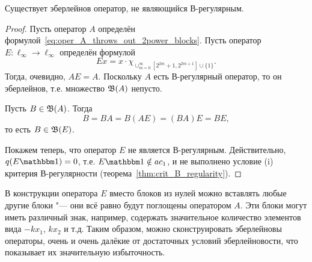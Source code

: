 \begin{theorem}
	\label{thm:Eberlein_but_not_B-regular_exists}
	Существует эберлейнов оператор, не являющийся В-регулярным.
\end{theorem}

\begin{proof}
	Пусть оператор $A$ определён формулой~\eqref{eq:oper_A_throws_out_2power_blocks}.
	Пусть оператор $E:\ell_\infty\to\ell_\infty$ определён формулой
	\begin{equation}
		Ex = x \cdot \chi_{\cup_{m=0}^{\infty}\left[2^{2 m}+1, 2^{2 m+1}\right] \cup\{1\}}
		.
	\end{equation}
	Тогда, очевидно, $AE=A$.
	Поскольку $A$ есть В-регулярный оператор, то он эберлейнов,
	т.е. множество $\mathfrak{B}(A)$ непусто.

	Пусть $B\in\mathfrak{B}(A)$. Тогда
	\begin{equation}
		B = BA = B(AE) = (BA)E = BE
		,
	\end{equation}
	то есть $B\in\mathfrak{B}(E)$.

	Покажем теперь, что оператор $E$ не является В-регулярным.
	Действительно, $q(E\one) =0$, т.е. $ E\one \notin ac_1$,
	и не выполнено условие (i) критерия В-регулярности (теорема~\ref{thm:crit_B_regularity}).
\end{proof}

\begin{remark}
	В конструкции оператора $E$ вместо блоков из нулей можно вставлять любые другие блоки "---
	они всё равно будут поглощены оператором $A$.
	Эти блоки могут иметь различный знак, например, содержать значительное количество
	элементов вида $-kx_1$, $kx_2$ и т.д.
	Таким образом, можно сконструировать эберлейновы операторы, очень и очень далёкие
	от достаточных условий эберлейновости,
	что показывает их значительную избыточность.
\end{remark}
